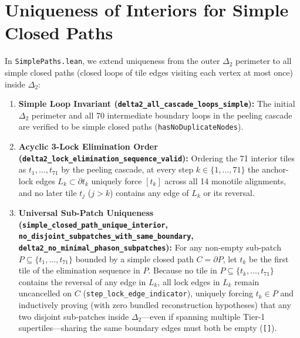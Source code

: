 \documentclass[11pt,a4paper]{article}
\begin{document}
\section{Uniqueness of Interiors for Simple Closed Paths}
\label{sec:simplepaths}
In \texttt{SimplePaths.lean}, we extend uniqueness from the outer $\Delta_2$ perimeter to all simple closed paths (closed loops of tile edges visiting each vertex at most once) inside $\Delta_2$:
\begin{enumerate}
\item \textbf{Simple Loop Invariant (\texttt{delta2\_all\_cascade\_loops\_simple}):} The initial $\Delta_2$ perimeter and all 70 intermediate boundary loops in the peeling cascade are verified to be simple closed paths (\texttt{hasNoDuplicateNodes}).
\item \textbf{Acyclic 3-Lock Elimination Order (\texttt{delta2\_lock\_elimination\_sequence\_valid}):} Ordering the 71 interior tiles as $t_1, \dots, t_{71}$ by the peeling cascade, at every step $k \in \{1, \dots, 71\}$ the anchor-lock edges $L_k \subset \partial t_k$ uniquely force $[t_k]$ across all 14 monotile alignments, and no later tile $t_j$ ($j > k$) contains any edge of $L_k$ or its reversal.
\item \textbf{Universal Sub-Patch Uniqueness (\texttt{simple\_closed\_path\_unique\_interior}, \texttt{no\_disjoint\_subpatches\_with\_same\_boundary}, \texttt{delta2\_no\_minimal\_phason\_subpatches}):} For any non-empty sub-patch $P \subseteq \{t_1, \dots, t_{71}\}$ bounded by a simple closed path $C = \partial P$, let $t_k$ be the first tile of the elimination sequence in $P$. Because no tile in $P \subseteq \{t_k, \dots, t_{71}\}$ contains the reversal of any edge in $L_k$, all lock edges in $L_k$ remain uncancelled on $C$ (\texttt{step\_lock\_edge\_indicator}), uniquely forcing $t_k \in P$ and inductively proving (with zero bundled reconstruction hypotheses) that any two disjoint sub-patches inside $\Delta_2$---even if spanning multiple Tier-1 supertiles---sharing the same boundary edges must both be empty (\texttt{[]}).
\end{enumerate}
\end{document}
